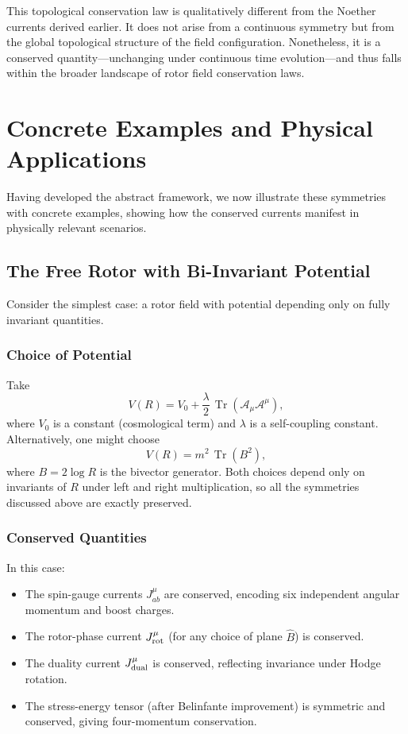 \documentclass[11pt,a4paper]{article}
\numberwithin{equation}{section}
\theoremstyle{plain}
\theoremstyle{definition}
\theoremstyle{remark}
\DeclareMathOperator{\Tr}{Tr}
\begin{document}
This topological conservation law is qualitatively different from the Noether currents derived earlier. It does not arise from a continuous symmetry but from the global topological structure of the field configuration. Nonetheless, it is a conserved quantity---unchanging under continuous time evolution---and thus falls within the broader landscape of rotor field conservation laws.

\section{Concrete Examples and Physical Applications}
\label{sec:examples}

Having developed the abstract framework, we now illustrate these symmetries with concrete examples, showing how the conserved currents manifest in physically relevant scenarios.

\subsection{The Free Rotor with Bi-Invariant Potential}

Consider the simplest case: a rotor field with potential depending only on fully invariant quantities.

\subsubsection{Choice of Potential}

Take
\begin{equation}
V(R) = V_0 + \frac{\lambda}{2}\,\Tr(\mathcal{A}_\mu\mathcal{A}^\mu),
\end{equation}
where $V_0$ is a constant (cosmological term) and $\lambda$ is a self-coupling constant. Alternatively, one might choose
\begin{equation}
V(R) = m^2\,\Tr(B^2),
\end{equation}
where $B = 2\log R$ is the bivector generator. Both choices depend only on invariants of $R$ under left and right multiplication, so all the symmetries discussed above are exactly preserved.

\subsubsection{Conserved Quantities}

In this case:

\begin{itemize}
  \item The spin-gauge currents $J^\mu_{ab}$ are conserved, encoding six independent angular momentum and boost charges.
  \item The rotor-phase current $J^\mu_{\rm rot}$ (for any choice of plane $\hat{B}$) is conserved.
  \item The duality current $J^\mu_{\rm dual}$ is conserved, reflecting invariance under Hodge rotation.
  \item The stress-energy tensor (after Belinfante improvement) is symmetric and conserved, giving four-momentum conservation.
\end{itemize}
\end{document}

